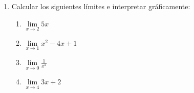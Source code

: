 \documentclass[12pt]{article}
\theoremstyle{definition}
\newtheorem*{myteo2}{Teorema}
\begin{document}
\begin{enumerate}
{{\begin{myteo2}
En símbolos, sean $f(x)$ y $g(x)$ dos funciones tales que:

\[\lim\limits_{x \to c} f(x) = L \text{ y } \lim\limits_{x \to c} g(x) = M,\]

\noindent y sea $k \in \mathbb{R}$. Entonces:

\begin{enumerate}
\item $\lim\limits_{x \to c}\left[f(x) + g(x)\right] = \lim\limits_{x \to c}f(x) + \lim\limits_{x \to c}g(x) = L + M$
\item $\lim\limits_{x \to c}\left[f(x) . g(x)\right] = \lim\limits_{x \to c}f(x) . \lim\limits_{x \to c}g(x) = L . M$
\item $\lim\limits_{x \to c}\left[k . f(x)\right] = k . \lim\limits_{x \to c}f(x) = k . L$
\item $\lim\limits_{x \to c}\left[\frac{f(x)}{g(x)}\right] = \frac{\lim\limits_{x \to c}f(x)}{\lim\limits_{x \to c}g(x)} = \frac{L}{M}$, siempre que $M \neq 0$.
\end{enumerate}
\end{myteo2}
}}



\item Calcular los siguientes límites e interpretar gráficamente:

\begin{multicols}{4}
\begin{enumerate}
	\item $\lim\limits_{x \to 2} 5x$
	\item $\lim\limits_{x \to 1} x^2 - 4x + 1$
	\item $\lim\limits_{x \to 0} \frac{1}{x^2}$			\item $\lim\limits_{x \to 4} 3x + 2$	
\end{enumerate}
\end{multicols}


\end{enumerate}
\end{document}
